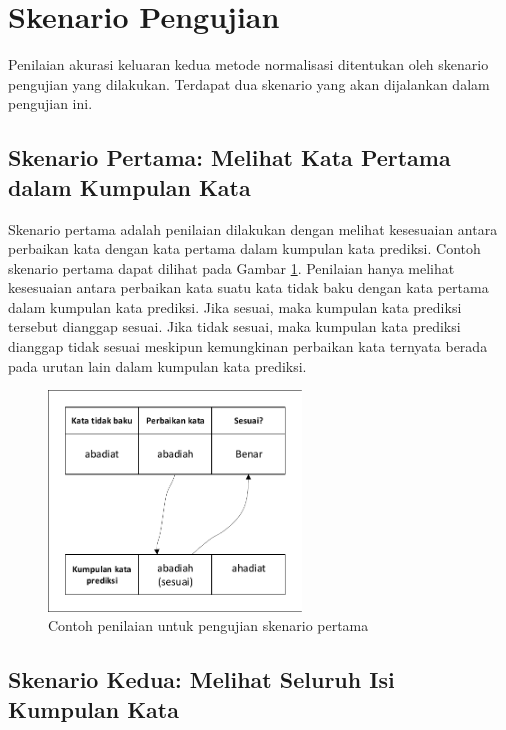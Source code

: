 \section{Skenario Pengujian}

Penilaian akurasi keluaran kedua metode normalisasi ditentukan oleh skenario pengujian yang dilakukan. Terdapat dua skenario yang akan dijalankan dalam pengujian ini.

\subsection{Skenario Pertama: Melihat Kata Pertama dalam Kumpulan Kata}

Skenario pertama adalah penilaian dilakukan dengan melihat kesesuaian antara perbaikan kata dengan kata pertama dalam kumpulan kata prediksi. Contoh skenario pertama dapat dilihat pada Gambar \ref{fig:skenario1_eg}. Penilaian hanya melihat kesesuaian antara perbaikan kata suatu kata tidak baku dengan kata pertama dalam kumpulan kata prediksi. Jika sesuai, maka kumpulan kata prediksi tersebut dianggap sesuai. Jika tidak sesuai, maka kumpulan kata prediksi dianggap tidak sesuai meskipun kemungkinan perbaikan kata ternyata berada pada urutan lain dalam kumpulan kata prediksi.
\begin{figure}[ht]
	\centering
	\includegraphics[width=0.6\textwidth, trim=2 2 2 2, clip]{resources/4/skenario1_eg.pdf}
	\caption{Contoh penilaian untuk pengujian skenario pertama}
	\label{fig:skenario1_eg}
\end{figure}

\subsection{Skenario Kedua: Melihat Seluruh Isi Kumpulan Kata}

